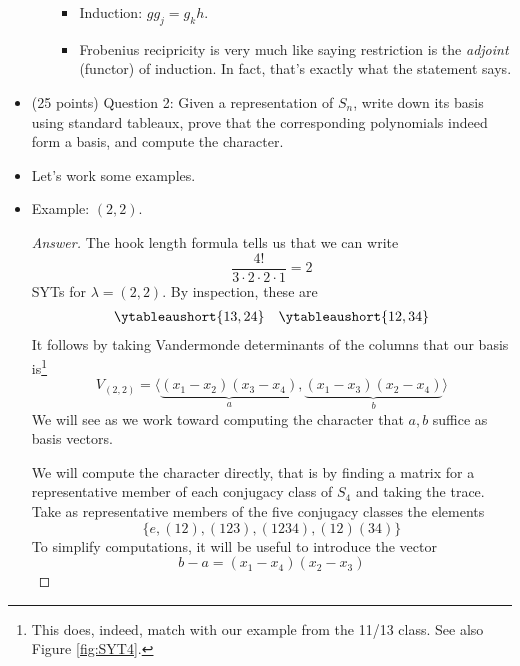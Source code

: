\documentclass[../notes.tex]{subfiles}
\begin{document}
\begin{itemize}
\begin{enumerate}
        \begin{itemize}
            \item Induction: $gg_j=g_kh$.
            \item Frobenius recipricity is very much like saying restriction is the \emph{adjoint} (functor) of induction. In fact, that's exactly what the statement says.
        \end{itemize}
    \end{enumerate}
    \item (25 points) Question 2: Given a representation of $S_n$, write down its basis using standard tableaux, prove that the corresponding polynomials indeed form a basis, and compute the character.
    \item Let's work some examples.
    \item Example: $(2,2)$.
    \begin{proof}[Answer]
        The hook length formula tells us that we can write
        \begin{equation*}
            \frac{4!}{3\cdot 2\cdot 2\cdot 1} = 2
        \end{equation*}
        SYTs for $\lambda=(2,2)$. By inspection, these are
        \begin{align*}
            \ytableaushort{13,24}&&
            \ytableaushort{12,34}
        \end{align*}
        It follows by taking Vandermonde determinants of the columns that our basis is\footnote{This does, indeed, match with our example from the 11/13 class. See also Figure \ref{fig:SYT4}.}
        \begin{equation*}
            V_{(2,2)} = \langle\underbrace{(x_1-x_2)(x_3-x_4)}_a,\underbrace{(x_1-x_3)(x_2-x_4)}_b\rangle
        \end{equation*}
        We will see as we work toward computing the character that $a,b$ suffice as basis vectors.\par
        We will compute the character directly, that is by finding a matrix for a representative member of each conjugacy class of $S_4$ and taking the trace. Take as representative members of the five conjugacy classes the elements
        \begin{equation*}
            \{e,(12),(123),(1234),(12)(34)\}
        \end{equation*}
        To simplify computations, it will be useful to introduce the vector
        \begin{equation*}
            b-a = (x_1-x_4)(x_2-x_3)
        \end{equation*}

\end{proof}
\end{itemize}
\end{document}
